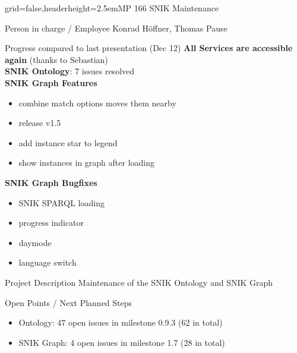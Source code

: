 \documentclass[]{kiesgrube}
\begin{document}
\begin{poster}%
{grid=false,headerheight=2.5em}{}{MP 166 SNIK Maintenance}{}

\begin{posterbox}[name=person,column=0,row=0]{Person in charge / Employee}
Konrad Höffner, Thomas Pause
\end{posterbox}
\begin{posterbox}[name=progress,below=person]{Progress compared to last presentation (Dec 12)}
\textbf{All Services are accessible again} (thanks to Sebastian)\\
\textbf{SNIK Ontology}: 7 issues resolved\\
\textbf{SNIK Graph Features}
\begin{itemize}
\item combine match options moves them nearby
\item release v1.5 
\item add instance star to legend
\item show instances in graph after loading
\end{itemize}
\textbf{SNIK Graph Bugfixes}
\begin{itemize}
\item SNIK SPARQL loading
\item progress indicator
\item daymode
\item language switch
\end{itemize}
\end{posterbox}
\begin{posterbox}[name=description,column=1,row=0]{Project Description}
Maintenance of the SNIK Ontology and SNIK Graph
\end{posterbox}
\begin{posterbox}[name=open,column=1,below=description]{Open Points / Next Planned Steps}
\begin{itemize}
\item Ontology: 47 open issues in milestone 0.9.3 (62 in total)
\item SNIK Graph: 4 open issues in milestone 1.7 (28 in total)
\end{itemize}
\end{posterbox}

\end{poster}
\end{document}
